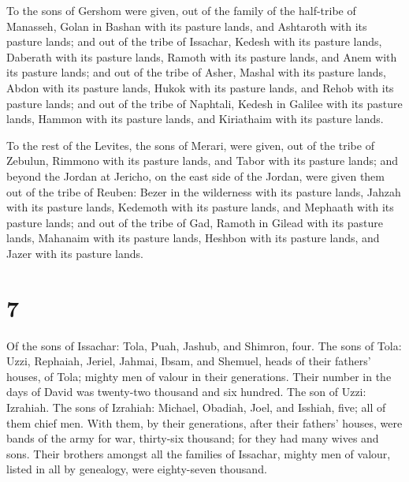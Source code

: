  To the sons of Gershom were given, out of the family of
the half-tribe of Manasseh, Golan in Bashan with its pasture lands, and
Ashtaroth with its pasture lands;  and out of the tribe
of Issachar, Kedesh with its pasture lands, Daberath with its pasture
lands,  Ramoth with its pasture lands, and Anem with its
pasture lands;  and out of the tribe of Asher, Mashal
with its pasture lands, Abdon with its pasture lands, 
Hukok with its pasture lands, and Rehob with its pasture lands;
 and out of the tribe of Naphtali, Kedesh in Galilee with
its pasture lands, Hammon with its pasture lands, and Kiriathaim with
its pasture lands.

 To the rest of the Levites, the sons of Merari, were
given, out of the tribe of Zebulun, Rimmono with its pasture lands, and
Tabor with its pasture lands;  and beyond the Jordan at
Jericho, on the east side of the Jordan, were given them out of the
tribe of Reuben: Bezer in the wilderness with its pasture lands, Jahzah
with its pasture lands,  Kedemoth with its pasture lands,
and Mephaath with its pasture lands;  and out of the
tribe of Gad, Ramoth in Gilead with its pasture lands, Mahanaim with its
pasture lands,  Heshbon with its pasture lands, and Jazer
with its pasture lands.

\hypertarget{section-6}{%
\section{7}\label{section-6}}

 Of the sons of Issachar: Tola, Puah, Jashub, and Shimron,
four.  The sons of Tola: Uzzi, Rephaiah, Jeriel, Jahmai,
Ibsam, and Shemuel, heads of their fathers' houses, of Tola; mighty men
of valour in their generations. Their number in the days of David was
twenty-two thousand and six hundred.  The son of Uzzi:
Izrahiah. The sons of Izrahiah: Michael, Obadiah, Joel, and Isshiah,
five; all of them chief men.  With them, by their
generations, after their fathers' houses, were bands of the army for
war, thirty-six thousand; for they had many wives and sons.
 Their brothers amongst all the families of Issachar,
mighty men of valour, listed in all by genealogy, were eighty-seven
thousand.

